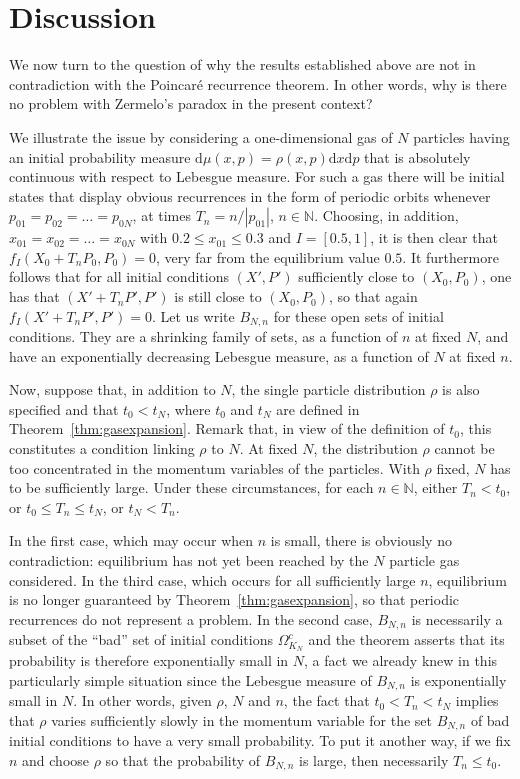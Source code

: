 \documentclass{article}
\newcommand {\N}{\mathbb{N}}
\newcommand {\rd}{\mathrm{d}}
\numberwithin{equation}{section}
\begin{document}
\section{Discussion}\label{s:discussion}
We now turn to the question of why the results established above are not in contradiction with the Poincar\'e recurrence theorem. In other words, why is there no problem with Zermelo's paradox in the present context?

We illustrate the issue by considering a one-dimensional gas of $N$ particles having an initial probability measure $\rd \mu(x,p)=\rho(x,p)\rd x\rd p$ that is absolutely continuous with respect to Lebesgue measure. For such a gas there will be initial states that display obvious recurrences in the form of periodic orbits whenever $p_{0 1}=p_{0 2}=\dots=p_{0 N}$, at times $T_n=n/|p_{0 1}|$, $n\in\N$. Choosing, in addition, $x_{01}=x_{02}=\dots=x_{0N}$ with  $0.2\leq x_{01}\leq 0.3$ and $I=[0.5, 1]$, it is then clear that $f_I(X_0+T_n P_0, P_0)=0$, very far from the equilibrium  value $0.5$. It furthermore follows that for all initial conditions $(X', P')$ sufficiently close to $(X_0, P_0)$, one has that $(X'+T_n P', P')$ is still close to $(X_0,P_0)$, so that again $f_I(X'+T_n P', P')=0$. Let us write $B_{N,n}$ for these open sets of initial conditions. They are a shrinking family of sets, as a function of $n$ at fixed $N$, and have an exponentially decreasing Lebesgue measure, as a
function of $N$ at fixed $n$.

Now, suppose that, in addition to $N$, the single particle distribution $\rho$ is also specified and that $t_0<t_N$, where $t_0$ and $t_N$ are defined in Theorem~\ref{thm:gasexpansion}. Remark that, in view of the definition of $t_0$, this constitutes a condition linking $\rho$ to $N$. At fixed $N$, the distribution $\rho$ cannot be too concentrated in the momentum variables of the particles. With $\rho$ fixed, $N$ has to be sufficiently large. Under these circumstances, for each $n\in\N$, either $T_n<t_0$, or $t_0\leq T_n\leq t_N$, or $t_N<T_n$.

In the first case, which may occur when $n$ is small, there is obviously no contradiction: equilibrium has not yet been reached by the $N$ particle gas considered. In the third case, which occurs for all sufficiently large $n$, equilibrium is no longer guaranteed by Theorem~\ref{thm:gasexpansion}, so that periodic recurrences do not represent a problem. In the second case, $B_{N, n}$  is necessarily a subset of the ``bad'' set of initial conditions $\Omega^c_{K_N}$ and the theorem asserts that its probability is therefore exponentially small in $N$, a fact we already knew in this particularly simple situation since the Lebesgue measure of $B_{N, n}$ is exponentially small in $N$. In other words, given $\rho$, $N$ and $n$, the fact that $t_0<T_n<t_N$ implies that $\rho$ varies sufficiently slowly in the momentum variable for the set $B_{N, n}$ of bad initial conditions to have a very small probability. To put it another way, if we fix $n$ and choose $\rho$ so that the probability of $B_{N, n}$ is large, then necessarily $T_n\leq t_0$.
\end{document}

